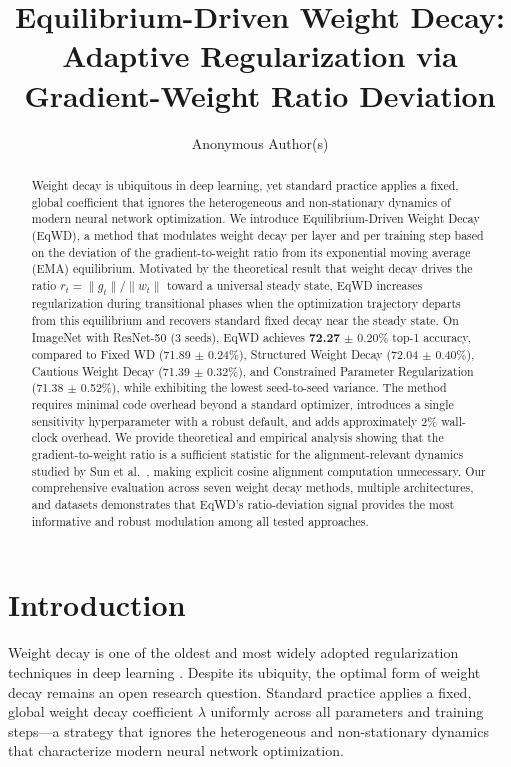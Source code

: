 \documentclass{article}
\title{Equilibrium-Driven Weight Decay: Adaptive Regularization via Gradient-Weight Ratio Deviation}
\author{%
  Anonymous Author(s)
}
\begin{document}
\maketitle

\begin{abstract}
Weight decay is ubiquitous in deep learning, yet standard practice
applies a fixed, global coefficient that ignores the heterogeneous and
non-stationary dynamics of modern neural network optimization. We
introduce Equilibrium-Driven Weight Decay (EqWD), a method that
modulates weight decay per layer and per training step based on the
deviation of the gradient-to-weight ratio from its exponential moving
average (EMA) equilibrium. Motivated by the theoretical result that
weight decay drives the ratio $r_t = \|g_t\| / \|w_t\|$ toward a
universal steady state, EqWD increases regularization during
transitional phases when the optimization trajectory departs from this
equilibrium and recovers standard fixed decay near the steady state. On
ImageNet with ResNet-50 (3 seeds),
EqWD achieves \textbf{72.27} $\pm$ 0.20\% top-1 accuracy, compared to Fixed WD
(71.89 $\pm$ 0.24\%), Structured Weight Decay (72.04 $\pm$ 0.40\%),
Cautious Weight Decay (71.39 $\pm$ 0.32\%), and Constrained Parameter
Regularization (71.38 $\pm$ 0.52\%), while exhibiting the lowest
seed-to-seed variance. The method requires minimal code overhead beyond
a standard optimizer, introduces a single sensitivity hyperparameter
with a robust default, and adds approximately 2\% wall-clock overhead.
We provide theoretical and empirical analysis showing that the
gradient-to-weight ratio is a sufficient statistic for the
alignment-relevant dynamics studied by Sun et al.~\citep{sun2025cvpr},
making explicit cosine alignment computation unnecessary. Our
comprehensive evaluation across seven weight decay methods, multiple
architectures, and datasets demonstrates that EqWD's ratio-deviation
signal provides the most informative and robust modulation among all
tested approaches.
\end{abstract}

\section{Introduction}
\label{sec:intro}

Weight decay is one of the oldest and most widely adopted regularization
techniques in deep learning \citep{krogh1991simple, hanson1988comparing}.
Despite its ubiquity, the optimal form of weight decay remains an open
research question. Standard practice applies a fixed, global weight
decay coefficient $\lambda$ uniformly across all parameters and
training steps---a strategy that ignores the heterogeneous and
non-stationary dynamics that characterize modern neural network
optimization.
\end{document}
